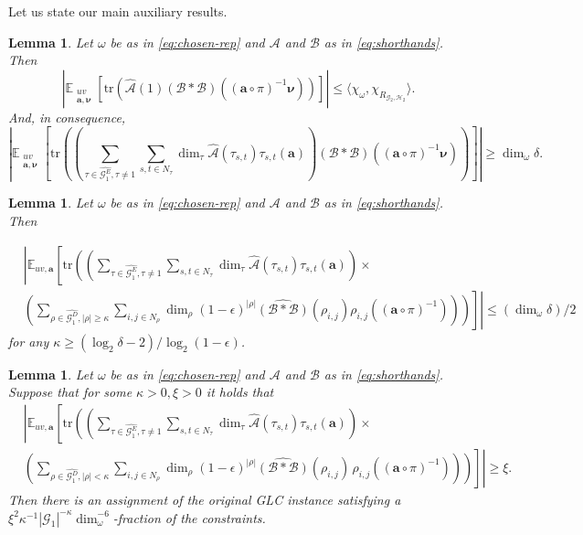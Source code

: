 \documentclass[a4paper,11pt]{article}
\newtheorem{lemma}[theorem]{Lemma}
\theoremstyle{definition}
\newcommand{\tuple}[1]{{\mathbf{#1}}}
\newcommand{\ex}[1]{\mathbb{E}_{#1}}
\newcommand{\gr}{\mathscr{G}}
\newcommand{\sgr}{\mathscr{H}}
\newcommand{\ba}{\mathbf{a}}
\newcommand{\tr}{\mathrm{tr}}
\newcommand{\A}{\mathcal{A}}
\newcommand{\B}{\mathcal{B}}
\begin{document}
Let us state our main auxiliary results.


\begin{lemma}
\label{le:soundness-aux-1}
Let $\omega$ be as in \eqref{eq:chosen-rep} and $\A$ and $\B$ as in \eqref{eq:shorthands}. Then
\[
\left| \ex{\substack{uv\\ \tuple{a}, \bm{\nu}}}\left[ \tr\left( \widehat{\A}(1)(\B*\B)((\ba\circ\pi)^{-1} \bm{\nu}) \right) \right] \right| \leq  \langle \chi_\omega, \chi_{R_{\gr_2,\sgr_2}} \rangle.  \]
And, in consequence,
\[
\left| \ex{\substack{uv \\ \tuple{a}, \bm{\nu}}}\left[
\tr\left(
\left(
\sum_{\tau\in \widehat{\gr_1^E}, \tau\neq 1
}
\sum_{
s,t\in N_\tau
}
\dim_\tau\widehat{\A}(\tau_{s,t}) \tau_{s,t}(\tuple{a}) \right)(\B*\B)((\ba\circ\pi)^{-1} \bm{\nu}) \right) \right] \right| \geq  \dim_\omega \delta.  \]
\end{lemma}

\begin{lemma} \label{le:EHR-23}
Let $\omega$ be as in \eqref{eq:chosen-rep} and $\A$ and $\B$ as in \eqref{eq:shorthands}. Then

\begin{align}
& \nonumber  \left| \ex{uv,\ba} \left[ 
     \tr \left(
    \left(
    \sum_{\tau\in \widehat{\gr_1^E}, \tau\neq 1}
    \sum_{s,t\in N_\tau}
\dim_\tau
\widehat{\A}(\tau_{s,t}) \tau_{s,t}(\tuple{a}) \right) \times
\right. \right. \right. 
\\ 
& \label{eq:le23_main}
\left. \left. \left.
\left(
\sum_{\rho \in \widehat{\gr_1^D}, |\rho| \geq \kappa}
\sum_{i,j \in N_\rho}
\dim_\rho (1-\epsilon)^{|\rho|} \widehat{(\B*\B)}(\rho_{i,j}) \rho_{i,j}( (\tuple{a} \circ \pi)^{-1})  \right) \right) \right] \right| \leq (\dim_\omega \delta)/2
\end{align}
for any $\kappa\geq (\log_2 \delta - 2)/\log_2(1-\epsilon)$.
\end{lemma}

\begin{lemma}
\label{le:EHR-25}
Let $\omega$ be as in \eqref{eq:chosen-rep} and $\A$ and $\B$ as in \eqref{eq:shorthands}.
Suppose that for some $\kappa>0, \xi>0$ it holds that
    \begin{align*}&
     \left| \ex{uv,\ba}\left[ \tr \left(
    \left( \sum_{\tau\in \widehat{\gr_1^E}, \tau\neq 1}
    \sum_{
s,t\in N_\tau
}
\dim_\tau
\widehat{\A}(\tau_{s,t}) \tau_{s,t}(\tuple{a}) \right) \right.\right.\right. \times &\\ &  
\left.\left.\left.
\left(\sum_{\rho\in \widehat{\gr_1^D}, |\rho| < \kappa}
\sum_{i,j\in N_\rho} \dim_\rho (1-\epsilon)^{|\rho|} \widehat{(\B*\B)}(\rho_{i,j}) \,
\rho_{i,j}((\ba\circ\pi)^{-1})
\right) \right)\right]\right|\geq \xi.   &  
\end{align*}
    Then there is an assignment of the original GLC instance satisfying a
    $\xi^2\kappa^{-1} |\gr_1|^{-\kappa} \dim_{\omega}^{-6}$-fraction of the constraints. 
\end{lemma}
\end{document}
